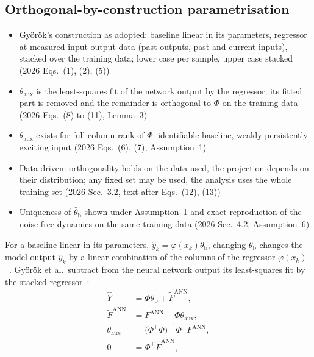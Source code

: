 \subsection{Orthogonal-by-construction parametrisation}\label{sec:obc_construction}
\ifdraft
\begin{itemize}
\item Gy\"or\"ok's construction as adopted: baseline linear in its parameters, regressor at measured input-output data (past outputs, past and current inputs), stacked over the training data; lower case per sample, upper case stacked (2026 Eqs.~(1), (2), (5))
\item $\theta_{\mathrm{aux}}$ is the least-squares fit of the network output by the regressor; its fitted part is removed and the remainder is orthogonal to $\Phi$ on the training data (2026 Eqs.~(8) to (11), Lemma~3)
\item $\theta_{\mathrm{aux}}$ exists for full column rank of $\Phi$: identifiable baseline, weakly persistently exciting input (2026 Eqs.~(6), (7), Assumption~1)
\item Data-driven: orthogonality holds on the data used, the projection depends on their distribution; any fixed set may be used, the analysis uses the whole training set (2026 Sec.~3.2, text after Eqs.~(12), (13))
\item Uniqueness of $\hat\theta_{\mathrm b}$ shown under Assumption~1 and exact reproduction of the noise-free dynamics on the same training data (2026 Sec.~4.2, Assumption~6)
\end{itemize}
\fi
For a baseline linear in its parameters,
$\hat y_k=\varphi(x_k)\theta_{\mathrm b}$,
changing $\theta_{\mathrm b}$ changes the model output $\hat y_k$
by a linear combination of the columns of the
regressor $\varphi(x_k)$~\cite[Eqs.~(2), (39)]{gyorok2026obc}.
Gy\"or\"ok et al.\ subtract from the neural network output
its least-squares fit by the stacked
regressor~\cite[Eqs.~(8), (9), (11), Lemma~3]{gyorok2026obc}:
\begin{equation}
\begin{aligned}
 \hat Y&=\Phi\theta_{\mathrm b}+\tilde F^{\mathrm{ANN}},\\
 \tilde F^{\mathrm{ANN}}&=F^{\mathrm{ANN}}-\Phi\theta_{\mathrm{aux}},\\
 \theta_{\mathrm{aux}}&=\bigl(\Phi^\top\Phi\bigr)^{-1}\Phi^\top F^{\mathrm{ANN}},\\
 0&=\Phi^\top\tilde F^{\mathrm{ANN}},
\end{aligned}
\label{eq:obc_gyorok}
\end{equation}
